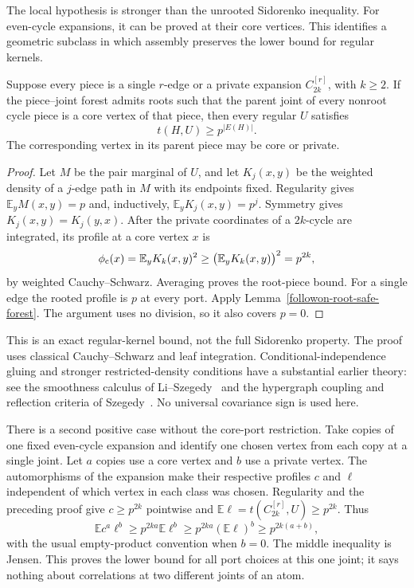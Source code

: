 The local hypothesis is stronger than the unrooted Sidorenko
inequality.  For even-cycle expansions, it can be proved at their core
vertices.  This identifies a geometric subclass in which assembly
preserves the lower bound for regular kernels.

\begin{proposition}
\label{followon-core-admissible-cycles}
Suppose every piece is a single $r$-edge or a private expansion
$C_{2k}^{[r]}$, with $k\ge2$.  If the piece--joint forest admits roots
such that the parent joint of every nonroot cycle piece is a core
vertex of that piece, then every regular $U$ satisfies
\[
 t(H,U)\ge p^{|E(H)|}.
\]
The corresponding vertex in its parent piece may be core or private.
\end{proposition}
\begin{proof}
Let $M$ be the pair marginal of $U$, and let $K_j(x,y)$ be the
weighted density of a $j$-edge path in $M$ with its endpoints fixed.
Regularity gives $\mathbb E_yM(x,y)=p$ and, inductively,
$\mathbb E_yK_j(x,y)=p^j$.  Symmetry gives $K_j(x,y)=K_j(y,x)$.
After the private coordinates of a $2k$-cycle are integrated, its
profile at a core vertex $x$ is
\[
 \phi_{\rm c}(x)
 =\mathbb E_yK_k(x,y)^2
 \ge\bigl(\mathbb E_yK_k(x,y)\bigr)^2
 =p^{2k},
\]
by weighted Cauchy--Schwarz.  Averaging proves the root-piece bound.
For a single edge the rooted profile is $p$ at every port.
Apply Lemma~\ref{followon-root-safe-forest}.  The argument uses no
division, so it also covers $p=0$.
\end{proof}

This is an exact regular-kernel bound, not the full Sidorenko property.
The proof uses classical Cauchy--Schwarz and leaf integration.
Conditional-independence gluing and stronger restricted-density
conditions have a substantial earlier theory: see the smoothness
calculus of Li--Szegedy~\citep{liszegedy2011} and the hypergraph
coupling and reflection criteria of Szegedy~\citep{szegedy2014}.
No universal covariance sign is used here.

There is a second positive case without the core-port restriction.
Take copies of one fixed even-cycle expansion and identify one chosen
vertex from each copy at a single joint.  Let $a$ copies use a core
vertex and $b$ use a private vertex.  The automorphisms of the expansion
make their respective profiles $c$ and $\ell$ independent of which
vertex in each class was chosen.  Regularity and the preceding proof
give $c\ge p^{2k}$ pointwise and $\mathbb E\ell=t(C_{2k}^{[r]},U)
\ge p^{2k}$.  Thus
\[
 \mathbb E c^a\ell^b
 \ge p^{2ka}\mathbb E\ell^b
 \ge p^{2ka}(\mathbb E\ell)^b
 \ge p^{2k(a+b)},
\]
with the usual empty-product convention when $b=0$.
The middle inequality is Jensen.  This proves the lower bound for
all port choices at this one joint; it says nothing about correlations
at two different joints of an atom.

